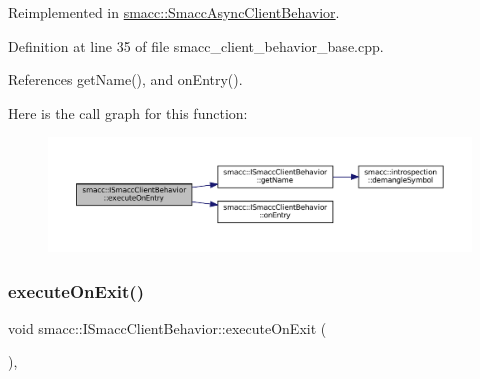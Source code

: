 Reimplemented in \hyperlink{classsmacc_1_1SmaccAsyncClientBehavior_ab8ca63d40d61554263466fe4c0b5cbd1}{smacc\+::\+Smacc\+Async\+Client\+Behavior}.



Definition at line 35 of file smacc\+\_\+client\+\_\+behavior\+\_\+base.\+cpp.



References get\+Name(), and on\+Entry().


Here is the call graph for this function\+:
\nopagebreak
\begin{figure}[H]
\begin{center}
\leavevmode
\includegraphics[width=350pt]{classsmacc_1_1ISmaccClientBehavior_a90b7032f7520f9e7e805835e6ed9d43e_cgraph}
\end{center}
\end{figure}
\mbox{\label{classsmacc_1_1ISmaccClientBehavior_ac88fbad78c928b4bca6d18659ddfd8c0}} 
\subsubsection{\texorpdfstring{execute\+On\+Exit()}{executeOnExit()}}
{\footnotesize\ttfamily void smacc\+::\+I\+Smacc\+Client\+Behavior\+::execute\+On\+Exit (\begin{DoxyParamCaption}{ }\end{DoxyParamCaption})\hspace{0.3cm}{\ttfamily [protected]}, {\ttfamily [virtual]}}



